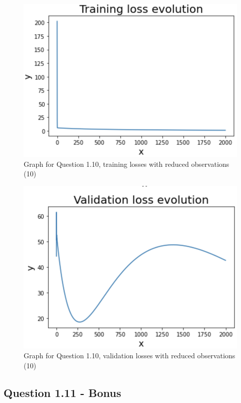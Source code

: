 \documentclass{article}
\begin{document}
\begin{figure}[!htb]
\centering
\includegraphics[scale = 0.8]{Question10_Graph2.png}
\caption{\label{fig:fig}Graph for Question 1.10, training losses with reduced observations (10)}
\end{figure}

\begin{figure}[!htb]
\centering
\includegraphics[scale = 0.8]{Question10_Graph3.png}
\caption{\label{fig:fig}Graph for Question 1.10, validation losses with reduced observations (10)}
\end{figure}

\newpage

\subsection{Question 1.11 - Bonus}
\end{document}
